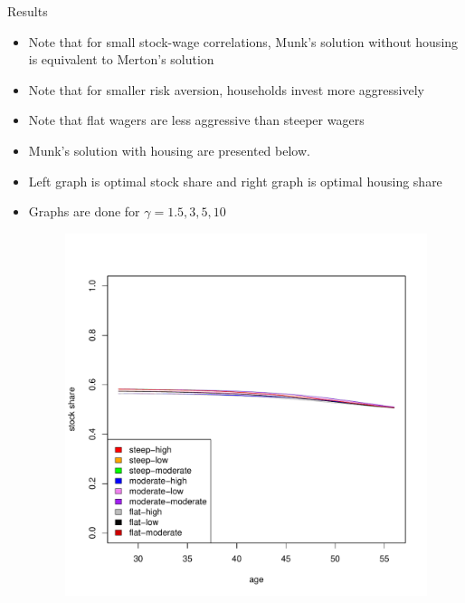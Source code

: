 \documentclass{beamer}
\begin{document}
\begin{frame}[allowframebreaks]{Results}
\begin{itemize}
\framebreak

	\item Note that for small stock-wage correlations, Munk's solution without housing is equivalent to Merton's solution
	\item Note that for smaller risk aversion, households invest more aggressively
	\item Note that flat wagers are less aggressive than steeper wagers
	\item Munk's solution with housing are presented below.
	\item Left graph is optimal stock share and right graph is optimal housing share
	\item Graphs are done for $\gamma=1.5,3,5,10$
\framebreak

\begin{figure}[H]
		\includegraphics[scale=0.25]{figs/smunkhouse15.pdf}

\end{figure}
\end{itemize}
\end{frame}
\end{document}
